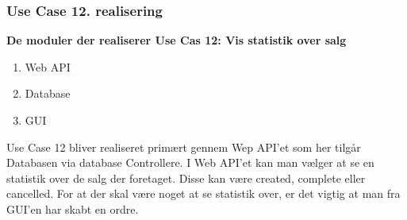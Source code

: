\subsubsection{Use Case 12. realisering}
\textbf{De moduler der realiserer Use Cas 12: Vis statistik over salg}

\begin{enumerate}
	\item Web API
	\item Database
	\item GUI
\end{enumerate}

Use Case 12 bliver realiseret primært gennem Wep API'et som her tilgår Databasen via database Controllere. I Web API'et kan man vælger at se en statistik over de salg der foretaget. Disse kan være created, complete eller cancelled. For at der skal være noget at se statistik over, er det vigtig at man fra GUI'en har skabt en ordre. 
